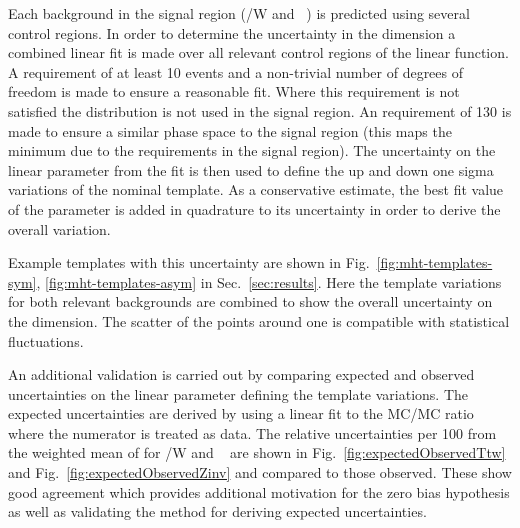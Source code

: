 Each background in the signal region (\ttbar/W  and \zInv~) is predicted 
using several control regions. In order to determine the uncertainty in
the \mht dimension a combined linear fit is made over all relevant control regions
of the linear function. A requirement of at least 10 events and a non-trivial
number of degrees of freedom is made to ensure a reasonable fit. Where this
requirement is not satisfied the \mht distribution is not used in the signal region.
An \mht requirement of 130 \GeV is made to ensure a similar phase space to 
the signal region (this maps the minimum \mht due to the \alt requirements in the signal region).
The uncertainty on the linear parameter from the fit is then
used to define the up and down one sigma variations of the nominal template.
As a conservative estimate, the best fit value of the parameter is 
added in quadrature to its uncertainty in order to derive the overall variation.

Example templates with this uncertainty are shown in Fig.~\ref{fig:mht-templates-sym}, \ref{fig:mht-templates-asym} 
in Sec.~\ref{sec:results}. Here the template variations for both relevant 
backgrounds are combined to show the overall uncertainty on the \mht dimension. 
The scatter of the points around one is compatible with statistical fluctuations.

An additional validation is carried out by comparing expected and observed uncertainties
on the linear parameter defining the template variations.
The expected uncertainties are derived by using a linear fit to the MC/MC ratio where the numerator
is treated as data. The relative uncertainties per 100 \GeV from the weighted mean of \mht
for \ttbar/W and \zInv~ are shown in Fig.~\ref{fig:expectedObservedTtw} 
and Fig.~\ref{fig:expectedObservedZinv} and compared to those observed.
These show good agreement which provides additional motivation for the 
zero bias hypothesis as well as validating the method for deriving expected uncertainties.


